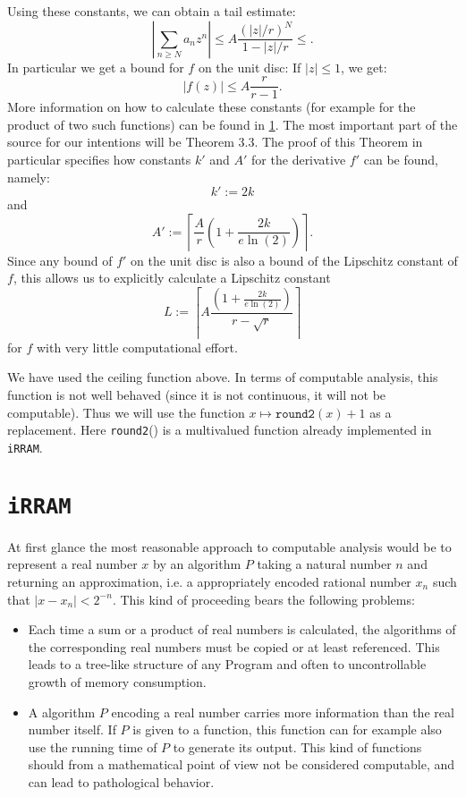 \documentclass{article}
\newcommand{\irram}{\texttt{iRRAM}\xspace}
\newcommand{\ir}[1]{\texttt{#1}\xspace}
\begin{document}
Using these constants, we can obtain a tail estimate:
\[ \left|\sum_{n \geq N} a_n z^n\right| \leq A \frac{(|z|/r)^N}{1- |z|/r} \leq. \]
In particular we get a bound for $f$ on the unit disc: If $|z|\leq 1$, we get:
\[ |f(z)| \leq A\frac r{r-1}. \]
More information on how to calculate these constants (for example for the product of two such functions) can be found in \ref{}. The most important part of the source for our intentions will be Theorem 3.3. The proof of this Theorem in particular specifies how constants $k'$ and $A'$ for the derivative $f'$ can be found, namely:
\[ k' := 2 k \]
and
\[ A' := \left\lceil \frac{A}{r} \left(1+ \frac{2k}{e \ln(2)}\right)\right\rceil. \]
Since any bound of $f'$ on the unit disc is also a bound of the Lipschitz constant of $f$, this allows us to explicitly calculate a Lipschitz constant
\[ L := \left\lceil A \frac{\left(1 + \frac{2k}{e\ln(2)}\right)}{r-\sqrt{r}}\right\rceil \]
for $f$ with very little computational effort.

We have used the ceiling function above. In terms of computable analysis, this function is not well behaved (since it is not continuous, it will not be computable). Thus we will use the function $x \mapsto \ir{round2}(x) +1$ as a replacement. Here \ir{round2}() is a multivalued function already implemented in \irram.

\section{\irram}

At first glance the most reasonable approach to computable analysis would be to represent a real number $x$ by an algorithm $P$ taking a natural number $n$ and returning an approximation, i.e. a appropriately encoded rational number $x_n$ such that $|x-x_n|<2^{-n}$. This kind of proceeding bears the following problems:
\begin{itemize}
\item Each time a sum or a product of real numbers is calculated, the algorithms of the corresponding real numbers must be copied or at least referenced. This leads to a tree-like structure of any Program and often to uncontrollable growth of memory consumption.
\item A algorithm $P$ encoding a real number carries more information than the real number itself. If $P$ is given to a function, this function can for example also use the running time of $P$ to generate its output. This kind of functions should from a mathematical point of view not be considered computable, and can lead to pathological behavior.
\end{itemize}
\end{document}
